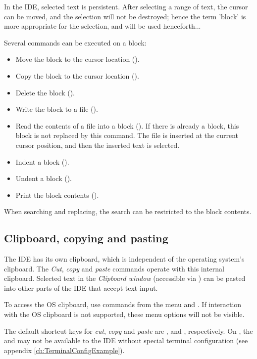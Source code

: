 In the \fpc IDE, selected text is persistent. After selecting a range of
text, the cursor can be moved, and the selection will not be destroyed;
hence the term 'block' is more appropriate for the selection, and will be
used henceforth...

Several commands can be executed on a block:
\begin{itemize}
\item Move the block to the cursor location ().
\item Copy the block to the cursor location ().
\item Delete the block ().
\item Write the block to a file ().
\item Read the contents of a file into a block ().
If there is already a block, this block is not replaced by this command.
The file is inserted at the current cursor position, and then the
inserted text is selected.
\item Indent a block ().
\item Undent a block ().
\item Print the block contents ().
\end{itemize}
When searching and replacing, the search can be restricted to the block
contents.
%
%
\subsection{Clipboard, copying and pasting}
The IDE has its own clipboard, which is independent of the operating system's
clipboard. The {\em Cut}, {\em copy} and {\em paste} commands operate with
this internal clipboard. Selected text in the {\em Clipboard window}
(accessible via ) can be pasted into other parts of
the IDE that accept text input.

To access the OS clipboard, use commands from the menu
 and . If interaction
with the OS clipboard is not supported, these menu options will not be visible.

The default shortcut keys for {\em cut}, {\em copy} and {\em paste} are
,  and , respectively. On \linux,
the  and  may not be available to the IDE without
special terminal configuration (see appendix \ref{ch:TerminalConfigExample}).

